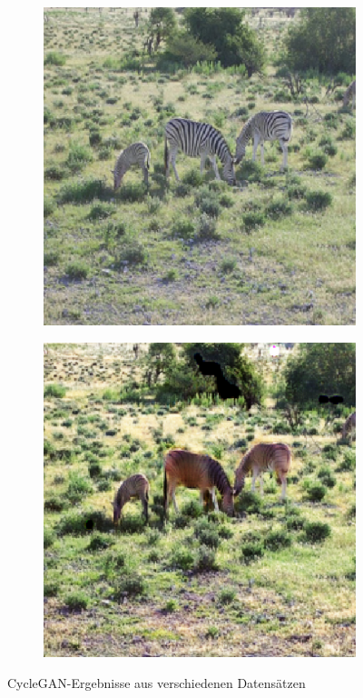 \begin{figure}
\begin{subfigure}[t]{.2\textwidth}
  \end{subfigure}
  \hfill
  \begin{subfigure}[t]{.2\textwidth}
    \centering
    \includegraphics[width=\linewidth]{images/cycleGanResults/zebra_input2.png}
  \end{subfigure}
  \begin{subfigure}[t]{.2\textwidth}
    \centering
    \includegraphics[width=\linewidth]{images/cycleGanResults/zebra_output2.png}
  \end{subfigure}
  \caption{CycleGAN-Ergebnisse aus verschiedenen Datensätzen}

\end{figure}



